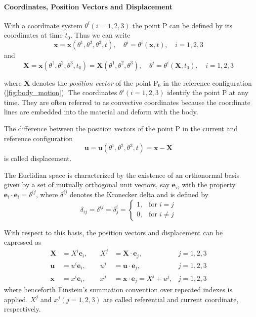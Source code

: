 \paragraph*{Coordinates, Position Vectors and Displacement} With a coordinate system \(\theta^{i} (i = 1,2,3)\) the point P can be defined by its coordinates at time \(t_{0}\). Thus we can write
\begin{equation}
    \bm{x} = \bm{x}(\theta^{1}, \theta^{2}, \theta^{3}, t), \quad
     \theta^{i}=\theta^{i}(\bm{x}, t), \quad 
     i = 1,2,3
\end{equation}
and
\begin{equation}
    \bm{X} = \bm{x}(\theta^{1}, \theta^{2}, \theta^{3}, t_{0}) = \bm{X}(\theta^{1}, \theta^{2}, \theta^{3}), \quad \theta^{i}=\theta^{i}(\bm{X}, t_{0}), \quad i = 1,2,3
\end{equation}

where \(\bm{X}\) denotes the \emph{position vector} of the point \(\mathrm{P}_{0}\) in the reference configuration (\cref{fig:body_motion}). The coordinates \(\theta^{i}(i = 1,2,3)\) identify the point P at any time. They are often referred to as convective coordinates because the coordinate lines are embedded into the material and deform with the body.

The difference between the position vectors of the point P in the current and reference configuration 
\begin{equation}
    \bm{u} = \bm{u}(\theta^{1}, \theta^{2}, \theta^{3}, t) = \bm{x} - \bm{X}
\end{equation}
is called displacement.

The Euclidian space is characterized by the existence of an orthonormal basis given by a set of mutually orthogonal unit vectors, say \(\bm{e}_{i}\), with the property \(\bm{e}_{i} \cdot \bm{e}_{i} = \delta^{ij}\), where \(\delta^{ij}\) denotes the Kronecker delta and is defined by 
\begin{equation}
    \delta_{ij} =\delta^{ij} = \delta^{i}_{j} = \begin{cases}
        1,              & \text{for } i = j\\
        0,              & \text{for } i \neq j
    \end{cases}
\end{equation}

With respect to this basis, the position vectors and displacement can be expressed as
\begin{align}
\bm{X} &= X^{i} \bm{e}_{i}, \quad &X^{j} &= \bm{X} \cdot \bm{e}_j,  &j = 1,2,3 \\
\bm{u} &= u^{i} \bm{e}_{i}, \quad &u^{j} &= \bm{u} \cdot \bm{e}_j,  &j = 1,2,3 \\
\bm{x} &= x^{i} \bm{e}_{i}, \quad &x^{j} &= \bm{x} \cdot \bm{e}_j = X^{j} + u^{j}, &j = 1,2,3 
\end{align}
where henceforth Einstein's summation convention over repeated indexes is applied. \(X^{j}\) and \(x^{j} (j = 1,2,3)\) are called referential and current coordinate, respectively.

